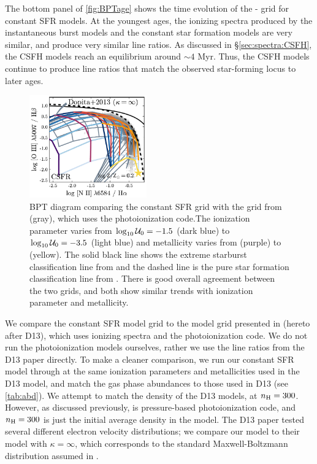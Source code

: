 The bottom panel of \ref{fig:BPTage} shows the time evolution of the \logz{}-\logU{} grid for constant SFR models. At the youngest ages, the ionizing spectra produced by the instantaneous burst models and the constant star formation models are very similar, and produce very similar line ratios. As discussed in \S\ref{sec:spectra:CSFH}, the CSFH models reach an equilibrium around $\sim4$ Myr. Thus, the CSFH models continue to produce line ratios that match the observed star-forming locus to later ages.
\begin{figure}[!htbp]
  \begin{centering}
    \includegraphics[width=0.45\textwidth]{manuscript/chapter2/f18.pdf}
    \caption{BPT diagram comparing the constant SFR grid with the grid from \citet{Dopita13} (gray), which uses the \Mappings photoionization code.The ionization parameter varies from $\log_{10} \mathcal{U}_0=-1.5$ (dark blue) to $\log_{10} \mathcal{U}_0=-3.5$ (light blue) and metallicity varies from  (purple) to  (yellow). The solid black line shows the extreme starburst classification line from \citet{Kewley01} and the dashed line is the pure star formation classification line from \citet{Kauffmann03a}. There is good overall agreement between the two grids, and both show similar trends with ionization parameter and metallicity.}
    \label{fig:CSFHdop}
  \end{centering}
\end{figure}

We compare the constant SFR model grid to the model grid presented in \citet{Dopita13} (hereto after D13), which uses \SB{} ionizing spectra and the \Mappings photoionization code. We do not run the photoionization models ourselves, rather we use the line ratios from the D13 paper directly. To make a cleaner comparison, we run our constant SFR model through \Cloudy at the same ionization parameters and metallicities used in the D13 model, and match the gas phase abundances to those used in D13 (see \ref{tab:abd}). We attempt to match the density of the D13 models, at $n_{\mathrm{H}}=300$. However, as discussed previously, \Mappings is pressure-based photoionization code, and $n_{\mathrm{H}}=300$ is just the initial average density in the \citet{Dopita13} model. The D13 paper tested several different electron velocity distributions; we compare our model to their model with $\kappa=\infty$, which corresponds to the standard Maxwell-Boltzmann distribution assumed in \Cloudy.

